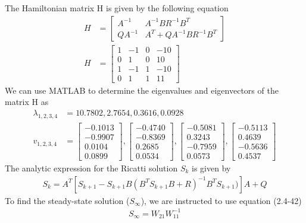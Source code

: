 \documentclass{article}
\begin{document}
  The Hamiltonian matrix H is given by the following equation
  \begin{align*}
	  H&=\begin{bmatrix}
		  A^{-1} & A^{-1}BR^{-1}B^T \\
		  QA^{-1} & A^T+QA^{-1}BR^{-1}B^T
	  \end{bmatrix} \\
	  H&=\begin{bmatrix}
		  1 & -1 & 0 & -10 \\
		  0 & 1 & 0 & 10 \\
		  1 & -1 & 1 & -10 \\
		  0 & 1 & 1 & 11
	  \end{bmatrix}
  \end{align*}
  We can use MATLAB to determine the eigenvalues and eigenvectors of the matrix H as
  \begin{align*}
	  \lambda_{1,2,3,4}&=10.7802, 2.7654, 0.3616, 0.0928 \\
	  v_{1,2,3,4}&=
	  \begin{bmatrix}
		  -0.1013 \\
		  -0.9907 \\
		  0.0104 \\
		  0.0899
	  \end{bmatrix},
	  \begin{bmatrix}
		  -0.4740 \\
		  -0.8369 \\
		  0.2685 \\
		  0.0534
	  \end{bmatrix},
	  \begin{bmatrix}
		  -0.5081 \\
		  0.3243 \\
		  -0.7959 \\
		  0.0573
	  \end{bmatrix},
	  \begin{bmatrix}
		  -0.5113 \\
		  0.4639 \\
		  -0.5636 \\
		  0.4537
	  \end{bmatrix}
  \end{align*}
  The analytic expression for the Ricatti solution $S_k$ is given by
  \begin{align*}
	  S_k=A^T[S_{k+1}-S_{k+1}B(B^TS_{k+1}B+R)^{-1}B^TS_{k+1})]A+Q
  \end{align*}
  To find the steady-state solution ($S_\infty$), we are instructed to use equation (2.4-42)
  \begin{align*}
	  S_{\infty}=W_{21}W_{11}^{-1}
  \end{align*}
\end{document}
